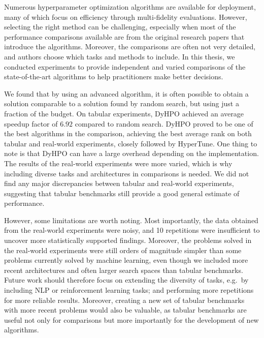 




Numerous hyperparameter optimization algorithms are available for deployment, many of which focus on efficiency through multi-fidelity evaluations. However, selecting the right method can be challenging, especially when most of the performance comparisons available are from the original research papers that introduce the algorithms. Moreover, the comparisons are often not very detailed, and authors choose which tasks and methods to include. In this thesis, we conducted experiments to provide independent and varied comparisons of the state-of-the-art algorithms to help practitioners make better decisions.

We found that by using an advanced algorithm, it is often possible to obtain a solution comparable to a solution found by random search, but using just a fraction of the budget. On tabular experiments, DyHPO achieved an average speedup factor of $6.92$ compared to random search. DyHPO proved to be one of the best algorithms in the comparison, achieving the best average rank on both tabular and real-world experiments, closely followed by HyperTune. One thing to note is that DyHPO can have a large overhead depending on the implementation. The results of the real-world experiments were more varied, which is why including diverse tasks and architectures in comparisons is needed. We did not find any major discrepancies between tabular and real-world experiments, suggesting that tabular benchmarks still provide a good general estimate of performance.

However, some limitations are worth noting. Most importantly, the data obtained from the real-world experiments were noisy, and 10 repetitions were insufficient to uncover more statistically supported findings. Moreover, the problems solved in the real-world experiments were still orders of magnitude simpler than some problems currently solved by machine learning, even though we included more recent architectures and often larger search spaces than tabular benchmarks. Future work should therefore focus on extending the diversity of tasks, e.g.\ by including NLP or reinforcement learning tasks; and performing more repetitions for more reliable results. Moreover, creating a new set of tabular benchmarks with more recent problems would also be valuable, as tabular benchmarks are useful not only for comparisons but more importantly for the development of new algorithms.
